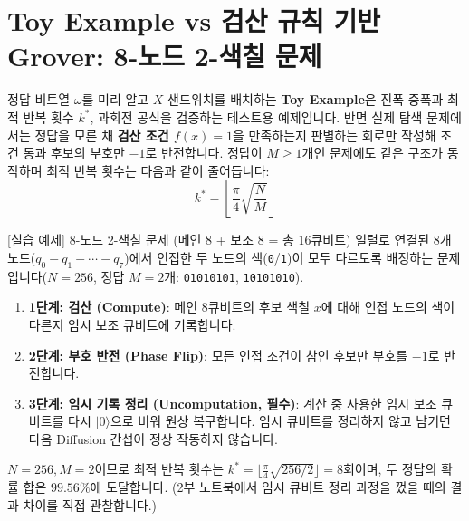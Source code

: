 \documentclass[11pt, a4paper]{article}
\newcommand{\ket}[1]{|#1\rangle}
\theoremstyle{definition}
\begin{document}
\section{Toy Example vs 검산 규칙 기반 Grover: 8-노드 2-색칠 문제}
정답 비트열 $\omega$를 미리 알고 $X$-샌드위치를 배치하는 \textbf{Toy Example}은 진폭 증폭과 최적 반복 횟수 $k^*$, 과회전 공식을 검증하는 테스트용 예제입니다. 반면 실제 탐색 문제에서는 정답을 모른 채 \textbf{검산 조건 $f(x)=1$}을 만족하는지 판별하는 회로만 작성해 조건 통과 후보의 부호만 $-1$로 반전합니다. 정답이 $M \ge 1$개인 문제에도 같은 구조가 동작하며 최적 반복 횟수는 다음과 같이 줄어듭니다:
$$k^* = \left\lfloor \frac{\pi}{4}\sqrt{\frac{N}{M}} \right\rfloor$$

\begin{worksheetbox}{[실습 예제] 8-노드 2-색칠 문제 (메인 8 + 보조 8 = 총 16큐비트)}
일렬로 연결된 8개 노드($q_0 - q_1 - \cdots - q_7$)에서 인접한 두 노드의 색(\texttt{0}/\texttt{1})이 모두 다르도록 배정하는 문제입니다($N=256$, 정답 $M=2$개: \texttt{01010101}, \texttt{10101010}).
\begin{enumerate}
    \item \textbf{1단계: 검산 (Compute)}: 메인 8큐비트의 후보 색칠 $x$에 대해 인접 노드의 색이 다른지 임시 보조 큐비트에 기록합니다.
    \item \textbf{2단계: 부호 반전 (Phase Flip)}: 모든 인접 조건이 참인 후보만 부호를 $-1$로 반전합니다.
    \item \textbf{3단계: 임시 기록 정리 (Uncomputation, 필수)}: 계산 중 사용한 임시 보조 큐비트를 다시 $\ket{0}$으로 비워 원상 복구합니다. 임시 큐비트를 정리하지 않고 남기면 다음 Diffusion 간섭이 정상 작동하지 않습니다.
\end{enumerate}
$N=256, M=2$이므로 최적 반복 횟수는 $k^* = \lfloor \frac{\pi}{4}\sqrt{256/2} \rfloor = 8$회이며, 두 정답의 확률 합은 $99.56\%$에 도달합니다. (2부 노트북에서 임시 큐비트 정리 과정을 껐을 때의 결과 차이를 직접 관찰합니다.)
\end{worksheetbox}

\end{document}
